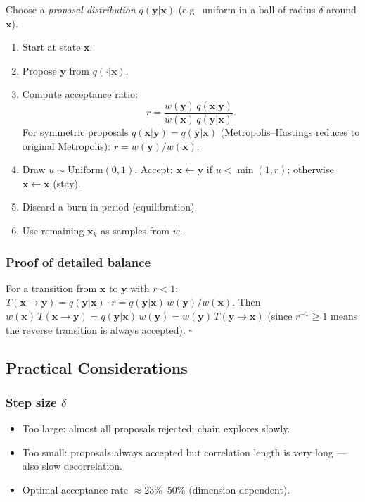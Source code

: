 Choose a \emph{proposal distribution} $q(\mathbf{y}|\mathbf{x})$
(e.g.\ uniform in a ball of radius $\delta$ around $\mathbf{x}$).

\begin{enumerate}
  \item Start at state $\mathbf{x}$.
  \item Propose $\mathbf{y}$ from $q(\cdot|\mathbf{x})$.
  \item Compute acceptance ratio:
        \begin{equation}
          r = \frac{w(\mathbf{y})\,q(\mathbf{x}|\mathbf{y})}
                   {w(\mathbf{x})\,q(\mathbf{y}|\mathbf{x})}.
          \label{eq:lec22:acceptance}
        \end{equation}
        For symmetric proposals $q(\mathbf{x}|\mathbf{y})=q(\mathbf{y}|\mathbf{x})$
        (Metropolis–Hastings reduces to original Metropolis):
        $r = w(\mathbf{y})/w(\mathbf{x})$.
  \item Draw $u\sim\text{Uniform}(0,1)$.
        Accept: $\mathbf{x}\leftarrow\mathbf{y}$ if $u < \min(1,r)$;
        otherwise $\mathbf{x}\leftarrow\mathbf{x}$ (stay).
  \item Discard a burn-in period (equilibration).
  \item Use remaining $\mathbf{x}_k$ as samples from $w$.
\end{enumerate}

\subsubsection*{Proof of detailed balance}
For a transition from $\mathbf{x}$ to $\mathbf{y}$ with $r<1$:
$T(\mathbf{x}\to\mathbf{y}) = q(\mathbf{y}|\mathbf{x})\cdot r
= q(\mathbf{y}|\mathbf{x})\,w(\mathbf{y})/w(\mathbf{x})$.
Then $w(\mathbf{x})\,T(\mathbf{x}\to\mathbf{y})
= q(\mathbf{y}|\mathbf{x})\,w(\mathbf{y})
= w(\mathbf{y})\,T(\mathbf{y}\to\mathbf{x})$ (since $r^{-1}\ge 1$
means the reverse transition is always accepted). $\square$

\subsection{Practical Considerations}\label{subsec:lec22:practice}

\subsubsection*{Step size $\delta$}
\begin{itemize}
  \item Too large: almost all proposals rejected; chain explores slowly.
  \item Too small: proposals always accepted but correlation length
        is very long — also slow decorrelation.
  \item Optimal acceptance rate $\approx 23$\%–$50$\% (dimension-dependent).
\end{itemize}

